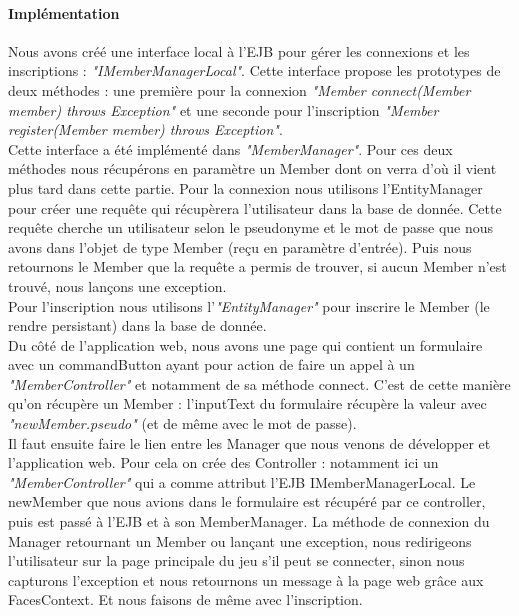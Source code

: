 \documentclass[a4paper,11pt]{report}
\begin{document}
      \paragraph{Implémentation}
        Nous avons créé une interface local à l'EJB pour gérer les connexions et les inscriptions : \textit{"IMemberManagerLocal"}. Cette interface propose les prototypes de deux méthodes : une première pour la connexion \textit{"Member connect(Member member) throws Exception"} et une seconde pour l'inscription \textit{"Member register(Member member) throws Exception"}.\\
        Cette interface a été implémenté dans \textit{"MemberManager"}. Pour ces deux méthodes nous récupérons en paramètre un Member dont on verra d'où il vient plus tard dans cette partie. Pour la connexion nous utilisons l'EntityManager pour créer une requête qui récupèrera l'utilisateur dans la base de donnée. Cette requête cherche un utilisateur selon le pseudonyme et le mot de passe que nous avons dans l'objet de type Member (reçu en paramètre d'entrée). Puis nous retournons le Member que la requête a permis de trouver, si aucun Member n'est trouvé, nous lançons une exception.\\
        Pour l'inscription nous utilisons l'\textit{"EntityManager"} pour inscrire le Member (le rendre persistant) dans la base de donnée.\\
        
        Du côté de l'application web, nous avons une page qui contient un formulaire avec un commandButton ayant pour action de faire un appel à un \textit{"MemberController"} et notamment de sa méthode connect. C'est de cette manière qu'on récupère un Member : l'inputText du formulaire récupère la valeur avec \textit{"newMember.pseudo"} (et de même avec le mot de passe).\\
        
        Il faut ensuite faire le lien entre les Manager que nous venons de développer et l'application web. Pour cela on crée des Controller : notamment ici un \textit{"MemberController"} qui a comme attribut l'EJB IMemberManagerLocal. Le newMember que nous avions dans le formulaire est récupéré par ce controller, puis est passé à l'EJB et à son MemberManager. La méthode de connexion du Manager retournant un Member ou lançant une exception, nous redirigeons l'utilisateur sur la page principale du jeu s'il peut se connecter, sinon nous capturons l'exception et nous retournons un message à la page web grâce aux FacesContext. Et nous faisons de même avec l'inscription.
\end{document}
